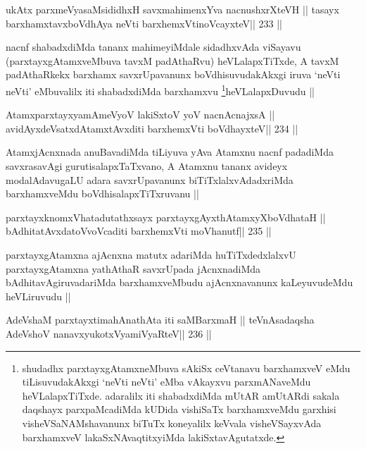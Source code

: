 \begin{shl}
ukAtx parxmeVyasaMsididhxH savxmahimenxYva nacnushxrXteVH ||
tasayx barxhamxtavxboVdhAya neVti barxhemxVtinoVcayxteV\hfill || 233 ||
\end{shl}

\begin{artha}
nacnf shabadxdiMda tananx mahimeyiMdale sidadhxvAda viSayavu
(parxtayxgAtamxveMbuva tavxM padAthaRvu) heVLalapxTiTxde, A
tavxM padAthaRkekx barxhamx savxrUpavanunx boVdhisuvudakAkxgi iruva
`neVti neVti' eMbuvalilx iti shabadxdiMda
barxhamxvu \footnote[2]{shudadhx parxtayxgAtamxneMbuva sAkiSx
  ceVtanavu barxhamxveV eMdu tiLisuvudakAkxgi `neVti neVti' eMba
  vAkayxvu parxmANaveMdu heVLalapxTiTxde. adaralilx iti shabadxdiMda
  mUtAR amUtARdi sakala daqshayx parxpaMcadiMda kUDida vishiSaTx
  barxhamxveMdu garxhisi visheVSaNAMshavanunx biTuTx koneyalilx
  keVvala visheVSayxvAda barxhamxveV lakaSxNAvaqtitxyiMda lakiSxtavAgutatxde.}heVLalapxDuvudu ||
\end{artha}

\begin{shl}
AtamxparxtayxyamAmeVyoV lakiSxtoV yoV nacnA\s cnajxsA ||
avidAyxdeVsatxdAtamxtAvxditi barxhemxVti boVdhayxteV\hfill || 234 ||
\end{shl}

\begin{artha}
AtamxjAcnxnada anuBavadiMda tiLiyuva yAva Atamxnu nacnf padadiMda
savxrasavAgi gurutisalapxTaTxvano, A Atamxnu tananx avideyx
modalAdavugaLU adara savxrUpavanunx biTiTxlalxvAdadxriMda
barxhamxveMdu boVdhisalapxTiTxruvanu ||
\end{artha}

\begin{shl}
parxtayxknomxVhatadutathxsayx parxtayxgAyxthAtamxyXboVdhataH ||
bAdhitatAvxdatoV\s voVcaditi barxhemxVti moVhanutf\hfill || 235 ||
\end{shl}

\begin{artha}
parxtayxgAtamxna ajAcnxna matutx adariMda huTiTxdedxlalxvU parxtayxgAtamxna yathAthaR savxrUpada jAcnxnadiMda
bAdhitavAgiruvadariMda barxhamxveMbudu ajAcnxnavanunx kaLeyuvudeMdu
heVLiruvudu ||
\end{artha}


\begin{shl}
\footnotemark[1]AdeVshaM parxtayxtimahAnathAta iti saMBarxmaH ||
teVnAsadaqsha AdeVshoV nanavxyukotxV\s yamiVyaRteV\hfill || 236 ||
\end{shl}

